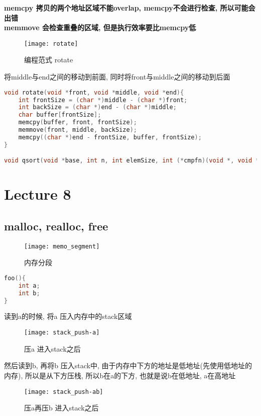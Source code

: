 \documentclass{article}
\begin{document}
\bigskip\noindent
\textbf{memcpy 拷贝的两个地址区域不能overlap, memcpy不会进行检查, 所以可能会出错\\
memmove 会检查重叠的区域, 但是执行效率要比memcpy低}

\begin{figure}[htbp]
	\centering
	\texttt{[image: rotate]}\\
	\caption{编程范式 rotate}\label{fig.rotate}
\end{figure}

将middle与end之间的移动到前面, 同时将front与middle之间的移动到后面
\begin{lstlisting}[language = C]
void rotate(void *front, void *middle, void *end){
	int frontSize = (char *)middle - (char *)front;
	int backSize = (char *)end - (char *)middle;
	char buffer[frontSize];
	memcpy(buffer, front, frontSize);
	memmove(front, middle, backSize);
	memcpy((char *)end - frontSize, buffer, frontSize);
}

void qsort(void *base, int n, int elemSize, int (*cmpfn)(void *, void *))
\end{lstlisting}

\section{Lecture 8}
\subsection{malloc, realloc, free}
\begin{figure}[htbp]
	\centering
	\texttt{[image: memo\_segment]}\\
	\caption{内存分段}\label{fig.memo.segment}
\end{figure}

\begin{lstlisting}[language = C]
foo(){
	int a;
	int b;
}
\end{lstlisting}
读到a的时候, 将a 压入内存中的stack区域
\begin{figure}[htbp]
	\centering
	\texttt{[image: stack\_push-a]}\\
	\caption{压a 进入stack之后}\label{fig.stack.push.a}
\end{figure}
然后读到b, 再将b 压入stack中, 由于内存中下方的地址是低地址(先使用低地址的内存), 所以是从下方压栈, 所以b在a的下方, 也就是说b在低地址, a在高地址
\begin{figure}[htbp]
	\centering
	\texttt{[image: stack\_push-ab]}\\
	\caption{压a再压b 进入stack之后}\label{fig.stack.push.ab}
\end{figure}
 \bigskip
\end{document}
